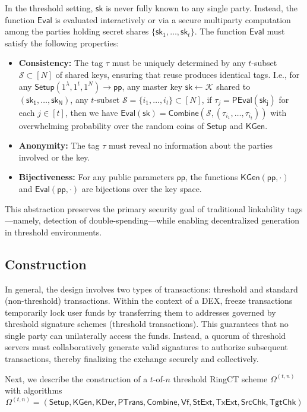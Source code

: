 In the threshold setting, $\mathsf{sk}$ is never fully known to any single party. Instead, the function $\mathsf{Eval}$ is evaluated interactively or via a secure multiparty computation among the parties holding secret shares $\{\mathsf{sk}_1, \ldots, \mathsf{sk}_t\}$. The function $\mathsf{Eval}$ must satisfy the following properties:
\begin{itemize}
    \item \textbf{Consistency:} The tag $\tau$ must be uniquely determined by any $t$-subset $\mathcal{S} \subset [N]$ of shared keys, ensuring that reuse produces identical tags. I.e., for any $ \mathsf{Setup} (1^\lambda, 1^t, 1^N) \to \mathsf{pp}$, any
master key $\mathsf{sk} \gets \mathcal{K}$ shared to $(\mathsf{sk_1}, \ldots, \mathsf{sk_N})$, any $t$-subset $\mathcal{S} = \{i_1, \ldots, i_t\} \subset [N]$, if $\tau_j = \mathsf{PEval}(\mathsf{sk_j})$ for each $j \in [t]$, then
we have $\mathsf{Eval}(\mathsf{sk}) = \mathsf{Combine}(\mathcal{S}, (\tau_{i_1}, \ldots, \tau_{i_t}))$ with overwhelming probability over the
random coins of $\mathsf{Setup}$ and $\mathsf{KGen}$. 
    \item \textbf{Anonymity:} The tag $\tau$ must reveal no information about the parties involved or the key.
    \item \textbf{Bijectiveness:} For any public parameters $\mathsf{pp}$, the functions $\mathsf{KGen(pp, \cdot)}$ and $\mathsf{Eval(pp, \cdot)}$ are bijections over the key space.
\end{itemize}

This abstraction preserves the primary security goal of traditional linkability tags—namely, detection of double-spending—while enabling decentralized generation in threshold environments.


\subsection{Construction}
In general, the design involves two types of transactions: threshold and standard (non-threshold) transactions. Within the context of a DEX, freeze transactions temporarily lock user funds by transferring them to addresses governed by threshold signature schemes (threshold transactions). This guarantees that no single party can unilaterally access the funds. Instead, a quorum of threshold servers must collaboratively generate valid signatures to authorize subsequent transactions, thereby finalizing the exchange securely and collectively. 

Next, we describe the construction of a $t$-of-$n$ threshold RingCT scheme $\Omega^{(t,n)}$ with algorithms
\[
\Omega^{(t,n)} = (\mathsf{Setup}, \mathsf{KGen}, \mathsf{KDer}, \mathsf{PTrans}, \mathsf{Combine}, \mathsf{Vf}, \mathsf{StExt}, \mathsf{TxExt}, \mathsf{SrcChk}, \mathsf{TgtChk})
\] 

